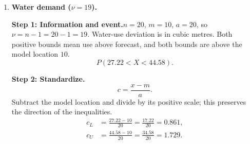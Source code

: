 \begin{enumerate}[leftmargin=*,label=\textbf{\arabic*.},itemsep=12pt,parsep=3pt,topsep=5pt]
\par\textbf{Step 5: Comparison errors.}\nopagebreak\enspace \par\noindent\begin{minipage}{\linewidth}
\par\textit{Shipping costs comparison.}
\[
E_A=|r_T-r_N|,\qquad E_{Pt}=\frac{100E_A}{|r_T|},\qquad E_{Pn}=\frac{100E_A}{|r_N|}.
\]
Here $r_T$ and $r_N$ are the displayed probabilities being compared.
\[
\begin{aligned}
E_A&=|0.8000-(0.8078)|=0.0078,\\
E_{Pt}&=\frac{100|0.8000-(0.8078)|}{|0.8000|}=\frac{100(0.0078)}{0.8000}\approx 0.98\%,\\
E_{Pn}&=\frac{100|0.8000-(0.8078)|}{|0.8078|}=\frac{100(0.0078)}{0.8078}\approx 0.97\%.
\end{aligned}
\]
\end{minipage}\par

\par\noindent\begin{minipage}{\linewidth}
\par\textbf{Step 6: Interpretation.}\nopagebreak\enspace The chance of a cost deviation exceeding $-49.64$ thousand USD is about $80.00\%$ under $t$ and $80.78\%$ under normal. Both exceed $0.5$ because $-49.64<-15=m$: each model is symmetric about $-15$, so the area to the right of a threshold below that centre includes the right half plus some of the left half. The normal probability is higher by $0.0078$, or $0.78$ percentage points.
\end{minipage}\par
\item \begin{minipage}[t]{\linewidth}\textbf{Water demand ($\nu=19$).}\nopagebreak
\par\textbf{Step 1: Information and event.}\nopagebreak\enspace $n=20$, $m=10$, $a=20$, so $\nu=n-1=20-1=19$. Water-use deviation is in cubic metres. Both positive bounds mean use above forecast, and both bounds are above the model location $10$.\[
P(27.22<X<44.58).
\]

\end{minipage}\par
\par\noindent\begin{minipage}{\linewidth}
\par\textbf{Step 2: Standardize.}\nopagebreak\enspace \[
c=\frac{x-m}{a}.
\]
Subtract the model location and divide by its positive scale; this preserves the direction of the inequalities.
\[
\begin{aligned}c_L&=\frac{27.22-10}{20}=\frac{17.22}{20}=0.861,\\c_U&=\frac{44.58-10}{20}=\frac{34.58}{20}=1.729.\end{aligned}
\]


\end{minipage}
\end{enumerate}
